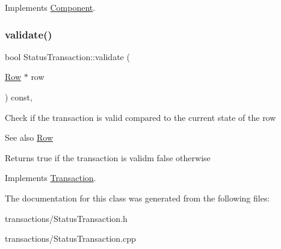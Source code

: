 Implements \mbox{\hyperlink{classComponent_a3e63d8c993e417a4af3f56d65ebfc7ea}{Component}}.

\mbox{\label{classStatusTransaction_a828dd6b4d51a33193b69454933be1cf4}} 
\subsubsection{\texorpdfstring{validate()}{validate()}}
{\footnotesize\ttfamily bool Status\+Transaction\+::validate (\begin{DoxyParamCaption}\item[{\mbox{\hyperlink{classRow}{Row}} $\ast$}]{row }\end{DoxyParamCaption}) const\hspace{0.3cm}{\ttfamily [override]}, {\ttfamily [virtual]}}

Check if the transaction is valid compared to the current state of the row \begin{DoxySeeAlso}{See also}
\mbox{\hyperlink{classRow}{Row}}
\end{DoxySeeAlso}
\begin{DoxyReturn}{Returns}
true if the transaction is validm false otherwise 
\end{DoxyReturn}


Implements \mbox{\hyperlink{classTransaction_a638518143f0defde1c3c73e33db1b7f1}{Transaction}}.



The documentation for this class was generated from the following files\+:\begin{DoxyCompactItemize}
\item 
transactions/Status\+Transaction.\+h\item 
transactions/Status\+Transaction.\+cpp\end{DoxyCompactItemize}
